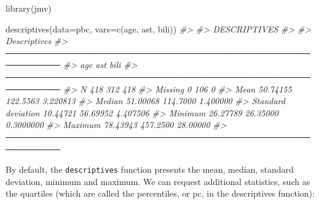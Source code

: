 \documentclass[
]{memoir}
\newenvironment{Shaded}{\begin{snugshade}}{\end{snugshade}}
\newcommand{\AttributeTok}[1]{\textcolor[rgb]{0.77,0.63,0.00}{#1}}
\newcommand{\CommentTok}[1]{\textcolor[rgb]{0.56,0.35,0.01}{\textit{#1}}}
\newcommand{\FunctionTok}[1]{\textcolor[rgb]{0.00,0.00,0.00}{#1}}
\newcommand{\NormalTok}[1]{#1}
\begin{document}
\begin{Shaded}
\begin{Highlighting}[]
\FunctionTok{library}\NormalTok{(jmv)}

\FunctionTok{descriptives}\NormalTok{(}\AttributeTok{data=}\NormalTok{pbc, }\AttributeTok{vars=}\FunctionTok{c}\NormalTok{(age, ast, bili))}
\CommentTok{\#\textgreater{} }
\CommentTok{\#\textgreater{}  DESCRIPTIVES}
\CommentTok{\#\textgreater{} }
\CommentTok{\#\textgreater{}  Descriptives                                                }
\CommentTok{\#\textgreater{}  ─────────────────────────────────────────────────────────── }
\CommentTok{\#\textgreater{}                          age         ast         bili        }
\CommentTok{\#\textgreater{}  ─────────────────────────────────────────────────────────── }
\CommentTok{\#\textgreater{}    N                          418         312          418   }
\CommentTok{\#\textgreater{}    Missing                      0         106            0   }
\CommentTok{\#\textgreater{}    Mean                  50.74155    122.5563     3.220813   }
\CommentTok{\#\textgreater{}    Median                51.00068    114.7000     1.400000   }
\CommentTok{\#\textgreater{}    Standard deviation    10.44721    56.69952     4.407506   }
\CommentTok{\#\textgreater{}    Minimum               26.27789    26.35000    0.3000000   }
\CommentTok{\#\textgreater{}    Maximum               78.43943    457.2500     28.00000   }
\CommentTok{\#\textgreater{}  ───────────────────────────────────────────────────────────}
\end{Highlighting}
\end{Shaded}

By default, the \texttt{descriptives} function presents the mean, median, standard deviation, minimum and maximum. We can request additional statistics, such as the quartiles (which are called the percentiles, or pc, in the descriptives function):
\end{document}
